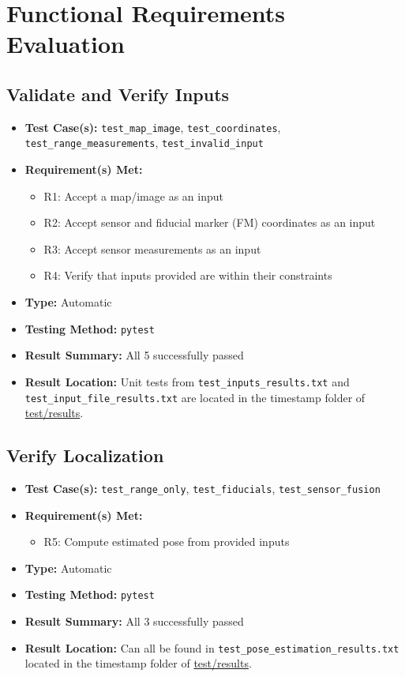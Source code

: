 \documentclass[12pt, titlepage]{article}
\begin{document}
\section{Functional Requirements Evaluation}

\subsection{Validate and Verify Inputs}
\begin{itemize}
  \item \textbf{Test Case(s): }\texttt{test\_map\_image}, \texttt{test\_coordinates}, \texttt{test\_range\_measurements}, \texttt{test\_invalid\_input}
  \item \textbf{Requirement(s) Met: }
  \begin{itemize}
    \item R1: Accept a map/image as an input
    \item R2: Accept sensor and fiducial marker (FM) coordinates as an input
    \item R3: Accept sensor measurements as an input
    \item R4: Verify that inputs provided are within their constraints
  \end{itemize}
  \item \textbf{Type: }Automatic
  \item \textbf{Testing Method: }\texttt{pytest}
  \item \textbf{Result Summary: }All 5 successfully passed
  \item \textbf{Result Location: }Unit tests from \texttt{test\_inputs\_results.txt} and \texttt{test\_input\_file\_results.txt} are located in the timestamp folder of \href{https://github.com/AliyahJimoh/2D-Localizer/tree/main/test/results/}{test/results}.
\end{itemize}


\subsection{Verify Localization}
\begin{itemize}
  \item \textbf{Test Case(s): }\texttt{test\_range\_only}, \texttt{test\_fiducials}, \texttt{test\_sensor\_fusion}
  \item \textbf{Requirement(s) Met: }
  \begin{itemize}
    \item R5: Compute estimated pose from provided inputs
  \end{itemize}
  \item \textbf{Type: }Automatic
  \item \textbf{Testing Method: }\texttt{pytest}
  \item \textbf{Result Summary: }All 3 successfully passed
  \item \textbf{Result Location: }Can all be found in \texttt{test\_pose\_estimation\_results.txt} located in the timestamp folder of \href{https://github.com/AliyahJimoh/2D-Localizer/tree/main/test/results/}{test/results}.
\end{itemize}
\end{document}
